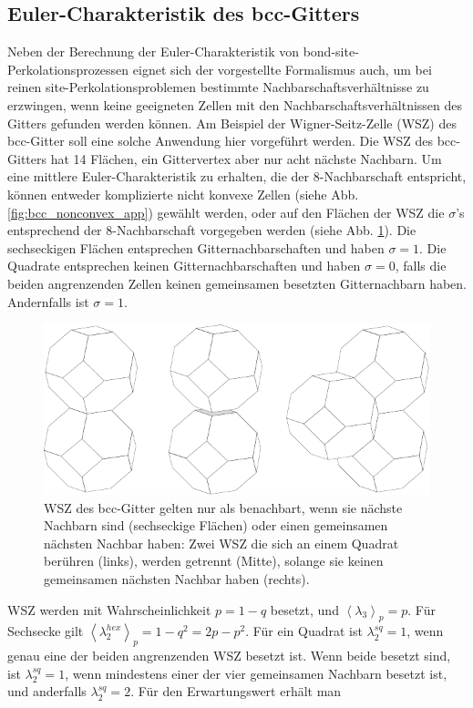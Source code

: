 \subsection{Euler-Charakteristik des bcc-Gitters}
\label{sec:mixedbcc}
Neben der Berechnung der Euler-Charakteristik von bond-site-Perkolationsprozessen eignet sich der vorgestellte Formalismus auch, um bei reinen site-Perkolationsproblemen bestimmte Nachbarschaftsverh\"altnisse zu erzwingen, wenn keine geeigneten Zellen mit den Nachbarschaftsverh\"altnissen des Gitters gefunden werden k\"onnen. Am Beispiel der Wigner-Seitz-Zelle (WSZ) des bcc-Gitter soll eine solche Anwendung hier vorgef\"uhrt werden. Die WSZ des bcc-Gitters hat 14 Fl\"achen, ein Gittervertex aber nur acht n\"achste Nachbarn. Um eine mittlere Euler-Charakteristik zu erhalten, die der 8-Nachbarschaft entspricht, k\"onnen entweder komplizierte nicht konvexe Zellen (siehe Abb. \ref{fig:bcc_nonconvex_app}) gew\"ahlt werden, oder auf den Fl\"achen der WSZ die $\sigma$'s entsprechend der 8-Nachbarschaft vorgegeben werden (siehe Abb. \ref{fig:bccconvexapp}). Die sechseckigen Fl\"achen entsprechen Gitternachbarschaften und haben $\sigma=1$. Die Quadrate entsprechen keinen Gitternachbarschaften und haben $\sigma=0$, falls die beiden angrenzenden Zellen keinen gemeinsamen besetzten Gitternachbarn haben. Andernfalls ist $\sigma=1$. 
\begin{figure}[htbp]
  \centering
  \includegraphics{./Mixed-figs/bcc_nn}
  \caption{WSZ des bcc-Gitter gelten nur als benachbart, wenn sie n\"achste Nachbarn sind (sechseckige Fl\"achen) oder einen gemeinsamen n\"achsten Nachbar haben: Zwei WSZ die sich an einem Quadrat ber\"uhren (links), werden getrennt (Mitte), solange sie keinen gemeinsamen n\"achsten Nachbar haben (rechts).}
  \label{fig:bccconvexapp}
\end{figure}
WSZ werden mit Wahrscheinlichkeit $p=1-q$ besetzt, und $\left<\lambda_3\right>_{p}=p$. F\"ur Sechsecke gilt $\left<\lambda_2^{hex}\right>_{p}=1-q^2=2p-p^2$. F\"ur ein Quadrat ist $\lambda_2^{sq}=1$, wenn genau eine der beiden angrenzenden WSZ besetzt ist. Wenn beide besetzt sind, ist $\lambda_2^{sq}=1$, wenn mindestens einer der vier gemeinsamen Nachbarn besetzt ist, und anderfalls $\lambda_2^{sq}=2$. F\"ur den Erwartungswert erh\"alt man
